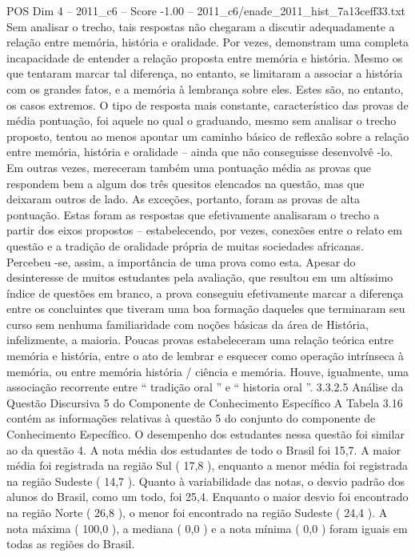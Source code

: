 \begin{textsample}{POS Dim 4 – 2011\_c6 – Score -1.00 – 2011\_c6/enade\_2011\_hist\_7a13ceff33.txt}
Sem analisar o trecho, tais respostas não chegaram a discutir adequadamente a relação entre memória, história e oralidade.
Por vezes, demonstram uma completa incapacidade de entender a relação proposta entre memória e história.
Mesmo os que tentaram marcar tal diferença, no entanto, se limitaram a associar a história com os grandes fatos, e a memória à lembrança sobre eles.
Estes são, no entanto, os casos extremos.
O tipo de resposta mais constante, característico das provas de média pontuação, foi aquele no qual o graduando, mesmo sem analisar o trecho proposto, tentou ao menos apontar um caminho básico de reflexão sobre a relação entre memória, história e oralidade – ainda que não conseguisse desenvolvê -lo.
Em outras vezes, mereceram também uma pontuação média as provas que respondem bem a algum dos três quesitos elencados na questão, mas que deixaram outros de lado.
As exceções, portanto, foram as provas de alta pontuação.
Estas foram as respostas que efetivamente analisaram o trecho a partir dos eixos propostos – estabelecendo, por vezes, conexões entre o relato em questão e a tradição de oralidade própria de muitas sociedades africanas.
Percebeu -se, assim, a importância de uma prova como esta.
Apesar do desinteresse de muitos estudantes pela avaliação, que resultou em um altíssimo índice de questões em branco, a prova conseguiu efetivamente marcar a diferença entre os concluintes que tiveram uma boa formação daqueles que terminaram seu curso sem nenhuma familiaridade com noções básicas da área de História, infelizmente, a maioria.
Poucas provas estabeleceram uma relação teórica entre memória e história, entre o ato de lembrar e esquecer como operação intrínseca à memória, ou entre memória história / ciência e memória.
Houve, igualmente, uma associação recorrente entre “ tradição oral ” e “ historia oral ”. 3.3.2.5 Análise da Questão Discursiva 5 do Componente de Conhecimento Específico A Tabela 3.16 contém as informações relativas à questão 5 do conjunto do componente de Conhecimento Específico.
O desempenho dos estudantes nessa questão foi similar ao da questão 4.
A nota média dos estudantes de todo o Brasil foi 15,7.
A maior média foi registrada na região Sul ( 17,8 ), enquanto a menor média foi registrada na região Sudeste ( 14,7 ).
Quanto à variabilidade das notas, o desvio padrão dos alunos do Brasil, como um todo, foi 25,4.
Enquanto o maior desvio foi encontrado na região Norte ( 26,8 ), o menor foi encontrado na região Sudeste ( 24,4 ).
A nota máxima ( 100,0 ), a mediana ( 0,0 ) e a nota mínima ( 0,0 ) foram iguais em todas as regiões do Brasil.

\end{textsample}
